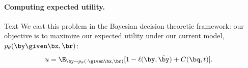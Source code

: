 \paragraph{Computing expected utility.}

\ac{Text}
We cast this problem in the Bayesian decision theoretic framework: our objective is to maximize our expected utility under our current model,
$\p(\by \given \bx, \br)$:
\begin{align*}
  u &= \E_{\by \sim \p(\cdot \given \bx, \br)}[1 - \ell(\by, \byt) + C(\bq, t)].
\end{align*}

